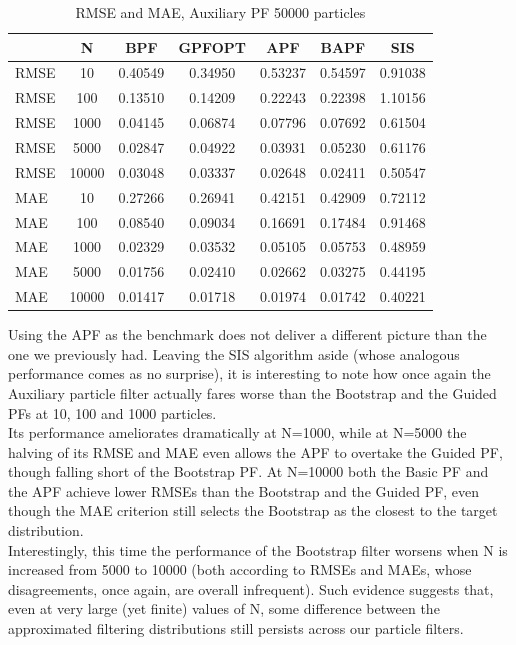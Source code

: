 \documentclass[
]{book}
\theoremstyle{break}
\theoremstyle{nonumberplain}
\begin{document}
\begin{longtable}[t]{lcccccc}
\caption{\label{tab:unnamed-chunk-44}RMSE and MAE, Auxiliary PF 50000 particles}\\
\toprule
  & N & BPF & GPFOPT & APF & BAPF & SIS\\
\midrule
RMSE & 10 & 0.40549 & 0.34950 & 0.53237 & 0.54597 & 0.91038\\
RMSE & 100 & 0.13510 & 0.14209 & 0.22243 & 0.22398 & 1.10156\\
RMSE & 1000 & 0.04145 & 0.06874 & 0.07796 & 0.07692 & 0.61504\\
RMSE & 5000 & 0.02847 & 0.04922 & 0.03931 & 0.05230 & 0.61176\\
RMSE & 10000 & 0.03048 & 0.03337 & 0.02648 & 0.02411 & 0.50547\\
\addlinespace
MAE & 10 & 0.27266 & 0.26941 & 0.42151 & 0.42909 & 0.72112\\
MAE & 100 & 0.08540 & 0.09034 & 0.16691 & 0.17484 & 0.91468\\
MAE & 1000 & 0.02329 & 0.03532 & 0.05105 & 0.05753 & 0.48959\\
MAE & 5000 & 0.01756 & 0.02410 & 0.02662 & 0.03275 & 0.44195\\
MAE & 10000 & 0.01417 & 0.01718 & 0.01974 & 0.01742 & 0.40221\\
\bottomrule
\end{longtable}

Using the APF as the benchmark does not deliver a different picture than
the one we previously had. Leaving the SIS algorithm aside (whose
analogous performance comes as no surprise), it is interesting to note
how once again the Auxiliary particle filter actually fares worse than
the Bootstrap and the Guided PFs at 10, 100 and 1000 particles.\\
Its performance ameliorates dramatically at N=1000, while at N=5000 the
halving of its RMSE and MAE even allows the APF to overtake the Guided
PF, though falling short of the Bootstrap PF. At N=10000 both the Basic
PF and the APF achieve lower RMSEs than the Bootstrap and the Guided PF,
even though the MAE criterion still selects the Bootstrap as the closest
to the target distribution.\\
Interestingly, this time the performance of the Bootstrap filter worsens
when N is increased from 5000 to 10000 (both according to RMSEs and
MAEs, whose disagreements, once again, are overall infrequent). Such
evidence suggests that, even at very large (yet finite) values of N,
some difference between the approximated filtering distributions still
persists across our particle filters.\\
\end{document}
